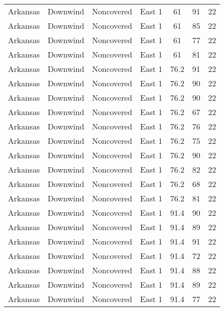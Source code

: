 \documentclass{article}
\begin{document}
\begin{longtable}[H]{ccccccc}
Arkansas & Downwind  & Noncovered & East 1        & 61           & 91          & 22  \\
Arkansas & Downwind  & Noncovered & East 1        & 61           & 85          & 22  \\
Arkansas & Downwind  & Noncovered & East 1        & 61           & 77          & 22  \\
Arkansas & Downwind  & Noncovered & East 1        & 61           & 81          & 22  \\
Arkansas & Downwind  & Noncovered & East 1        & 76.2         & 91          & 22  \\
Arkansas & Downwind  & Noncovered & East 1        & 76.2         & 90          & 22  \\
Arkansas & Downwind  & Noncovered & East 1        & 76.2         & 90          & 22  \\
Arkansas & Downwind  & Noncovered & East 1        & 76.2         & 67          & 22  \\
Arkansas & Downwind  & Noncovered & East 1        & 76.2         & 76          & 22  \\
Arkansas & Downwind  & Noncovered & East 1        & 76.2         & 75          & 22  \\
Arkansas & Downwind  & Noncovered & East 1        & 76.2         & 90          & 22  \\
Arkansas & Downwind  & Noncovered & East 1        & 76.2         & 82          & 22  \\
Arkansas & Downwind  & Noncovered & East 1        & 76.2         & 68          & 22  \\
Arkansas & Downwind  & Noncovered & East 1        & 76.2         & 81          & 22  \\
Arkansas & Downwind  & Noncovered & East 1        & 91.4         & 90          & 22  \\
Arkansas & Downwind  & Noncovered & East 1        & 91.4         & 89          & 22  \\
Arkansas & Downwind  & Noncovered & East 1        & 91.4         & 91          & 22  \\
Arkansas & Downwind  & Noncovered & East 1        & 91.4         & 72          & 22  \\
Arkansas & Downwind  & Noncovered & East 1        & 91.4         & 88          & 22  \\
Arkansas & Downwind  & Noncovered & East 1        & 91.4         & 89          & 22  \\
Arkansas & Downwind  & Noncovered & East 1        & 91.4         & 77          & 22  \\

\end{longtable}
\end{document}
